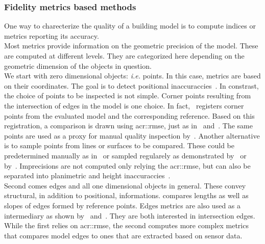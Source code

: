         \subsubsection{Fidelity metrics based methods}
            One way to charecterize the quality of a building model is to compute indices or metrics reporting its accuracy.\\

            Most metrics provide information on the geometric precision of the model.
            These are computed at different levels.
            They are categorized here depending on the geometric dimension of the objects in question.\\
            We start with zero dimensional objects: \textit{i.e.} points.
            In this case, metrics are based on their coordinates.
            The goal is to detect positional inaccuraccies~\parencite{kaartinen2005accuracy}.
            In constrast, the choice of points to be inspected is not simple.
            Corner points resulting from the intersection of edges in the model is one choice.
            In fact,~\textcite{zeng2014multicriteria} registers corner points from the evaluated model and the corresponding reference.
            Based on this registration, a comparison is drawn using \gls{acr::rmse}, just as in~\parencite{landes2012quality} and~\parencite{you2011quality}.
            The same points are used as a proxy for manual quality inspection by~\textcite{elberink2011quality}.
            Another alternative is to sample points from lines or surfaces to be compared.
            These could be predetermined manually as in~\textcite{kaartinen2005accuracy} or sampled regularely as demonstrated by~\textcite{vogtle2003quality} or by~\textcite{tran2019geometric}.
            Imprecisions are not computed only relying the \gls{acr::rmse}, but can also be separated into planimetric and height inaccuraccies~\parencite{vogtle2003quality, kaartinen2005accuracy}.\\
            Second comes edges and all one dimensional objects in general.
            These convey structural, in addition to positional, informations.
            \textcite{kaartinen2005accuracy} compares lengths as well as slopes of edges formed by reference points.
            Edges metrics are also used as a intermediary as shown by~\textcite{elberink2011quality} and~\textcite{michelin2013quality}.
            They are both interested in intersection edges.
            While the first relies on \gls{acr::rmse}, the second computes more complex metrics that compares model edges to ones that are extracted based on sensor data.\\
